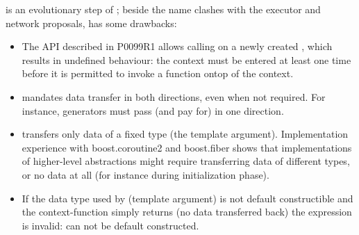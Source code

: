 \label{motivation}

\cc is an evolutionary step of \ectx; beside the name clashes with the executor
and network proposals, \ectx has some drawbacks:
\begin{itemize}
    \item The API described in P0099R1 allows calling
         on a newly
        created \ectx, which results in undefined behaviour: the context
        must be entered at least one time before it is permitted to
        invoke a function ontop of the context.
    \item \ectx mandates data transfer in both directions, even when not
        required. For instance, generators must pass (and pay for)
         in one direction.
    \item \ectx transfers only data of a fixed type (the template
        argument). Implementation experience with boost.coroutine2 and
        boost.fiber shows that implementations of higher-level abstractions
        might require transferring data of different types, or no data at all
        (for instance during initialization phase).
    \item If the data type used by \ectx (template argument) is not default
        constructible and the context-function simply returns (no data
        transferred back) the expression  is
        invalid:  can not be default constructed.
\end{itemize}
